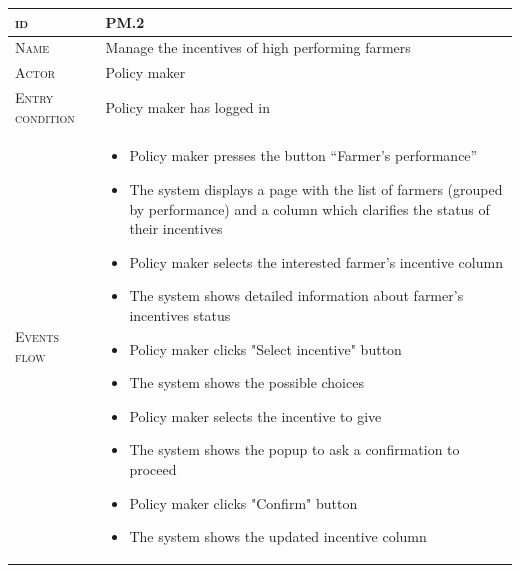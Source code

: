 \begin{table}[H]
    \centering
    \begin{tabular}{|l|p{}|}
        \hline %
    	\textsc{id}                 &   PM.2\\
    	\hline %
    	\textsc{Name}               &   Manage the incentives of high performing farmers \\
    	\hline %
    	\textsc{Actor}             &   Policy maker\\
    	\hline %
    	\textsc{Entry condition}   &   Policy maker has logged in\\
    	\hline %
    	\textsc{Events flow}         &   %
            	                        \begin{itemize}
                                    	    \item Policy maker presses the button “Farmer’s performance”
                                    		\item The system displays a page with the list of farmers (grouped by performance) and a column which clarifies the status of their incentives 
                                       		\item Policy maker selects the interested farmer’s incentive column
                                    		\item The system shows detailed information about farmer’s incentives status
                                    		\item Policy maker clicks "Select incentive" button
                                    		\item The system shows the possible choices
                                    		\item Policy maker selects the incentive to give
                                    		\item The system shows the popup to ask a confirmation to proceed
                                    		\item Policy maker clicks "Confirm" button
                                    		\item The system shows the updated incentive column
                                        \end{itemize}\\

\end{tabular}
\end{table}
